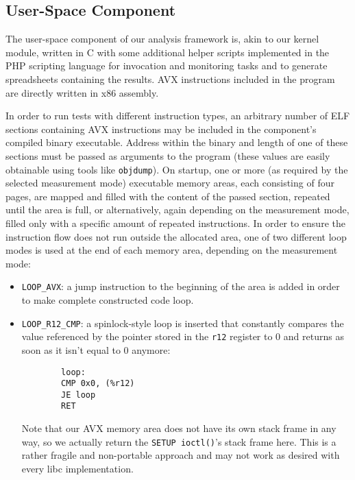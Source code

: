 \subsection{User-Space Component}
\label{sec:analysis:design:userspace}

The user-space component of our analysis framework is, akin to our kernel module, written in C with some additional helper scripts implemented in the PHP scripting language for invocation and monitoring tasks and to generate spreadsheets containing the results. \gls{AVX} instructions included in the program are directly written in x86 assembly.

In order to run tests with different instruction types, an arbitrary number of \gls{ELF} sections containing \gls{AVX} instructions may be included in the component's compiled binary executable. Address within the binary and length of one of these sections must be passed as arguments to the program (these values are easily obtainable using tools like \texttt{objdump}). On startup, one or more (as required by the selected measurement mode) executable memory areas, each consisting of four pages, are mapped and filled with the content of the passed section, repeated until the area is full, or alternatively, again depending on the measurement mode, filled only with a specific amount of repeated instructions. In order to ensure the instruction flow does not run outside the allocated area, one of two different loop modes is used at the end of each memory area, depending on the measurement mode:

\begin{itemize}
	\item \texttt{LOOP\_AVX}: a jump instruction to the beginning of the area is added in order to make complete constructed code loop.
	\item \texttt{LOOP\_R12\_CMP}: a spinlock-style loop is inserted that constantly compares the value referenced by the pointer stored in the \texttt{r12} register to $0$ and returns as soon as it isn't equal to $0$ anymore:
		\begin{verbatim}
		loop:
		CMP 0x0, (%r12)
		JE loop
		RET
		\end{verbatim}
		Note that our \gls{AVX} memory area does not have its own stack frame in any way, so we actually return the \texttt{SETUP ioctl()}'s stack frame here. This is a rather fragile and non-portable approach and may not work as desired with every \gls{libc} implementation.
\end{itemize}

